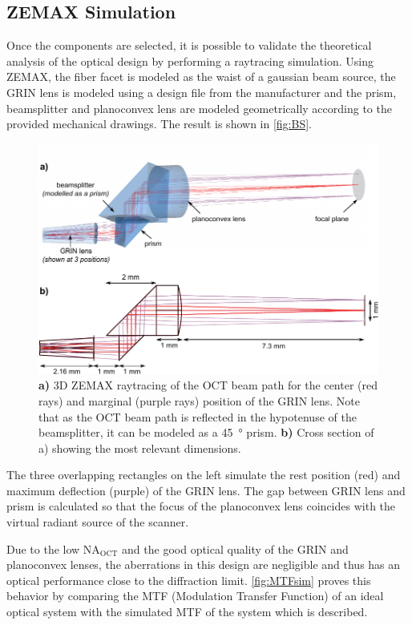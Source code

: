 \subsection{ZEMAX Simulation}

Once the components are selected, it is possible to validate the theoretical analysis of the optical design by  performing a raytracing simulation. Using ZEMAX, the fiber facet is modeled as the waist of a gaussian beam source, the  GRIN lens is modeled using a design file from the manufacturer and the prism, beamsplitter and planoconvex lens are modeled geometrically according to the provided mechanical drawings. The result is shown in \autoref{fig:BS}.

\begin{figure}[h!]\centering
      \includegraphics{figures/30_DesignSimulation/Optical/beamsplitterAll.pdf}
      \caption{\textbf{a)} 3D ZEMAX raytracing of the OCT beam path for the center (red rays) and marginal (purple rays) position of the GRIN lens. Note that as the OCT beam path is reflected in the hypotenuse of the beamsplitter, it can be modeled as a \SI{45}{\degree} prism.      
      \textbf{b)} Cross section of a) showing the most relevant dimensions.}
      \label{fig:BS}
\end{figure}

The three overlapping rectangles on the left simulate the rest position (red) and maximum deflection (purple) of the GRIN lens. The gap between GRIN lens and prism is calculated so that the focus of the planoconvex lens coincides with the virtual radiant source of the scanner.

	Due to the low $\mathrm{NA_\mathrm{OCT}}$ and the good optical quality of the GRIN and planoconvex lenses, the aberrations in this design are negligible and thus has an optical performance close to the diffraction limit. \autoref{fig:MTFsim} proves this behavior by comparing the MTF (Modulation Transfer Function) of an ideal optical system with the simulated MTF of the system which is described.

